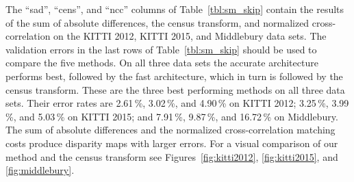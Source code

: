 \documentclass[twoside,11pt]{article}
\begin{document}
The ``sad'', ``cens'', and ``ncc'' columns of Table~\ref{tbl:sm_skip} contain
the results of the sum of absolute differences, the census transform, and
normalized cross-correlation on the KITTI 2012, KITTI 2015, and Middlebury data
sets. The validation errors in the last rows of Table~\ref{tbl:sm_skip} should
be used to compare the five methods. On all three data sets the accurate
architecture performs best, followed by the fast architecture, which in turn is
followed by the census transform. These are the three best performing methods
on all three data sets. Their error rates are 2.61\,\%, 3.02\,\%, and 4.90\,\%
on KITTI 2012; 3.25\,\%, 3.99\,\%, and 5.03\,\% on KITTI 2015; and 7.91\,\%,
9.87\,\%, and 16.72\,\% on Middlebury. The sum of absolute differences and the
normalized cross-correlation matching costs produce disparity maps with larger
errors. For a visual comparison of our method and the census transform see
Figures~\ref{fig:kitti2012}, \ref{fig:kitti2015}, and \ref{fig:middlebury}.
\end{document}
